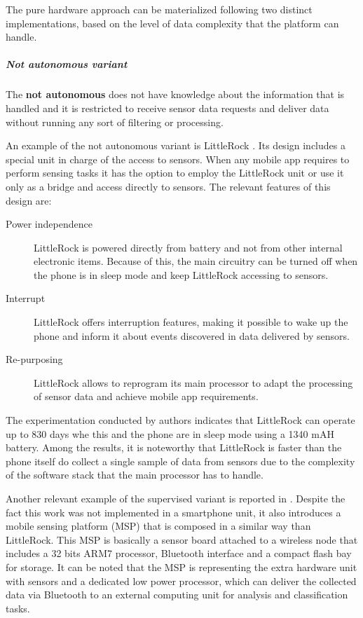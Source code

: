 The pure hardware approach can be materialized following two distinct implementations, based on the level of data complexity that the platform can handle.

\subparagraph{Not autonomous variant}
\label{subp:not_autonomous_variant}

The \textbf{not autonomous} does not have knowledge about the information that is handled and it is restricted to receive sensor data requests and deliver data without running any sort of filtering or processing.

An example of the not autonomous variant is LittleRock \cite{Priyantha2011}.
Its design includes a special unit in charge of the access to sensors.
When any mobile app requires to perform sensing tasks it has the option to employ the LittleRock unit or use it only as a bridge and access directly to sensors.
The relevant features of this design are:

\begin{description}
  \item[Power independence] LittleRock is powered directly from battery and not from other internal electronic items.
  Because of this, the main circuitry can be turned off when the phone is in sleep mode and keep LittleRock accessing to sensors.
  
  \item[Interrupt] LittleRock offers interruption features, making it possible to wake up the phone and inform it about events discovered in data delivered by sensors.
  
  \item[Re-purposing] LittleRock allows to reprogram its main processor to adapt the processing of sensor data and achieve mobile app requirements.
\end{description}

The experimentation conducted by authors indicates that LittleRock can operate up to 830 days whe this and the phone are in sleep mode using a 1340 mAH battery.
Among the results, it is noteworthy that LittleRock is faster than the phone itself do collect a single sample of data from sensors due to the complexity of the software stack that the main processor has to handle.

Another relevant example of the supervised variant is reported in \cite{Choudhury2008}.
Despite the fact this work was not implemented in a smartphone unit, it also introduces a mobile sensing platform (MSP) that is composed in a similar way than LittleRock.
This MSP is basically a sensor board attached to a wireless node that includes a 32 bits ARM7 processor, Bluetooth interface and a compact flash bay for storage.
It can be noted that the MSP is representing the extra hardware unit with sensors and a dedicated low power processor, which can deliver the collected data via Bluetooth to an external computing unit for analysis and classification tasks.


